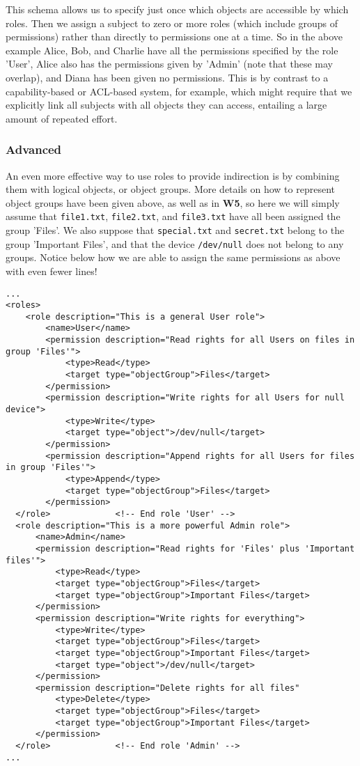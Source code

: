 \documentclass{article}
\providecommand{\inlinecode}{\texttt}
\begin{document}
This schema allows us to specify just once which objects are accessible by which roles. Then we assign a subject to zero or more roles (which include groups of permissions) rather than directly to permissions one at a time. So in the above example Alice, Bob, and Charlie have all the permissions specified by the role 'User', Alice also has the permissions given by 'Admin' (note that these may overlap), and Diana has been given no permissions.
This is by contrast to a capability-based or ACL-based system, for example, which might require that we explicitly link all subjects with all objects they can access, entailing a large amount of repeated effort.

\subsubsection{Advanced}
An even more effective way to use roles to provide indirection is by combining them with logical objects, or object groups. More details on how to represent object groups have been given above, as well as in \textbf{W5},
so here we will simply assume that \inlinecode{file1.txt}, \inlinecode{file2.txt}, and \inlinecode{file3.txt} have all been assigned the group 'Files'. We also suppose that \inlinecode{special.txt} and \inlinecode{secret.txt} belong to the group 'Important Files', and that the device \inlinecode{/dev/null} does not belong to any groups. Notice below how we are able to assign the same permissions as above with even fewer lines! \pagebreak
\begin{lstlisting}
...
<roles>
    <role description="This is a general User role">
        <name>User</name>
        <permission description="Read rights for all Users on files in group 'Files'">
            <type>Read</type>
            <target type="objectGroup">Files</target>
        </permission>
        <permission description="Write rights for all Users for null device">
            <type>Write</type>
            <target type="object">/dev/null</target>
        </permission>
        <permission description="Append rights for all Users for files in group 'Files'">
            <type>Append</type>
            <target type="objectGroup">Files</target>
        </permission>
  </role>             <!-- End role 'User' -->
  <role description="This is a more powerful Admin role">
      <name>Admin</name>
      <permission description="Read rights for 'Files' plus 'Important files'">
          <type>Read</type>
          <target type="objectGroup">Files</target>
          <target type="objectGroup">Important Files</target>
      </permission>
      <permission description="Write rights for everything">
          <type>Write</type>
          <target type="objectGroup">Files</target>
          <target type="objectGroup">Important Files</target>
          <target type="object">/dev/null</target>
      </permission>
      <permission description="Delete rights for all files"
          <type>Delete</type>
          <target type="objectGroup">Files</target>
          <target type="objectGroup">Important Files</target>
      </permission>
  </role>             <!-- End role 'Admin' -->
...
\end{lstlisting}
\end{document}
